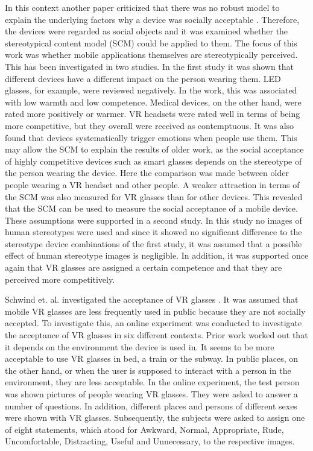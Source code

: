 \documentclass[sigchi]{acmart}
\begin{document}
In this context another paper criticized that there was no robust model to explain the underlying factors why a device was socially acceptable \cite{schwind2019understanding}. Therefore, the devices were regarded as social objects and it was examined whether the stereotypical content model (SCM) could be applied to them. The focus of this work was whether mobile applications themselves are stereotypically perceived. This has been investigated in two studies. In the first study it was shown that different devices have a different impact on the person wearing them. LED glasses, for example, were reviewed negatively. In the work, this was associated with low warmth and low competence. Medical devices, on the other hand, were rated more positively or warmer. VR headsets were rated well in terms of being more competitive, but they overall were received as contemptuous. It was also found that devices systematically trigger emotions when people use them. This may allow the SCM to explain the results of older work, as the social acceptance of highly competitive devices such as smart glasses depends on the stereotype of the person wearing the device. Here the comparison was made between older people wearing a VR headset and other people. A weaker attraction in terms of the SCM was also measured for VR glasses than for other devices. This revealed that the SCM can be used to measure the social acceptance of a mobile device. These assumptions were supported in a second study. In this study no images of human stereotypes were used and since it showed no significant difference to the stereotype device combinations of the first study, it was assumed that a possible effect of human stereotype images is negligible. In addition, it was supported once again that VR glasses are assigned a certain competence and that they are perceived more competitively.

Schwind et. al. investigated the acceptance of VR glasses \cite{schwind2018virtual}. It was assumed that mobile VR glasses are less frequently used in public because they are not socially accepted. To investigate this, an online experiment was conducted to investigate the acceptance of VR glasses in six different contexts. Prior work worked out that it depends on the environment the device is used in. It seems to be more acceptable to use VR glasses in bed, a train or the subway. In public places, on the other hand, or when the user is supposed to interact with a person in the environment, they are less acceptable. 
In the online experiment, the test person was shown pictures of people wearing VR glasses. They were asked to answer a number of questions. In addition, different places and persons of different sexes were shown with VR glasses. Subsequently, the subjects were asked to assign one of eight statements, which stood for Awkward, Normal, Appropriate, Rude, Uncomfortable, Distracting, Useful and Unnecessary, to the respective images.
\end{document}
